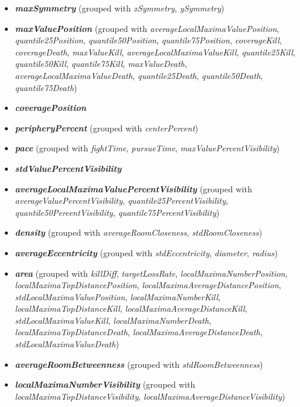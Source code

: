\begin{itemize}
    \item \textbf{\textit{maxSymmetry}} (grouped with \textit{xSymmetry}, \textit{ySymmetry})
    \item \textbf{\textit{maxValuePosition}} (grouped with \textit{averageLocalMaximaValuePosition}, \textit{quantile25\-Position}, \textit{quantile50\-Position}, \textit{quantile75\-Position}, \textit{coverageKill}, \textit{coverageDeath}, \textit{maxValueKill}, \textit{averageLocalMaximaValueKill}, \textit{quantile25\-Kill}, \textit{quantile50\-Kill}, \textit{quantile75\-Kill}, \textit{maxValueDeath}, \textit{averageLocalMaximaValueDeath}, \textit{quantile25\-Death}, \textit{quantile50\-Death}, \textit{quantile75\-Death})
    \item \textbf{\textit{coveragePosition}}
    \item \textbf{\textit{peripheryPercent}} (grouped with \textit{centerPercent})
    \item \textbf{\textit{pace}} (grouped with \textit{fightTime}, \textit{pursueTime}, \textit{maxValuePercentVisibility})
    \item \textbf{\textit{stdValuePercentVisibility}} 
    \item \textbf{\textit{averageLocalMaximaValuePercentVisibility}} (grouped with \textit{averageValuePercentVisibility}, \textit{quantile25PercentVisibility}, \textit{quantile50PercentVisibility}, \textit{quantile75\-Percent\-Visibility})
    \item \textbf{\textit{density}} (grouped with \textit{averageRoomCloseness}, \textit{stdRoomCloseness})
    \item \textbf{\textit{averageEccentricity}} (grouped with \textit{stdEccentricity}, \textit{diameter}, \textit{radius})
    \item \textbf{\textit{area}} (grouped with \textit{killDiff}, \textit{targetLossRate}, \textit{localMaximaNumberPosition}, \textit{localMaximaTopDistancePosition}, \textit{localMaximaAverageDistancePosition}, \textit{stdLocalMaximaValuePosition}, \textit{localMaximaNumberKill}, \textit{localMaximaTopDistanceKill}, \textit{localMaximaAverageDistanceKill}, \textit{stdLocalMaxima\-Value\-Kill}, \textit{localMaximaNumberDeath}, \textit{localMaximaTopDistanceDeath}, \textit{localMaximaAverageDistanceDeath}, \textit{stdLocalMaxima\-Value\-Death})
    \item \textbf{\textit{averageRoomBetweenness}} (grouped with \textit{stdRoomBetweenness})
    \item \textbf{\textit{localMaximaNumberVisibility}} (grouped with \textit{localMaximaTopDistanceVisibility}, \textit{localMaximaAverageDistanceVisibility})

\end{itemize}

